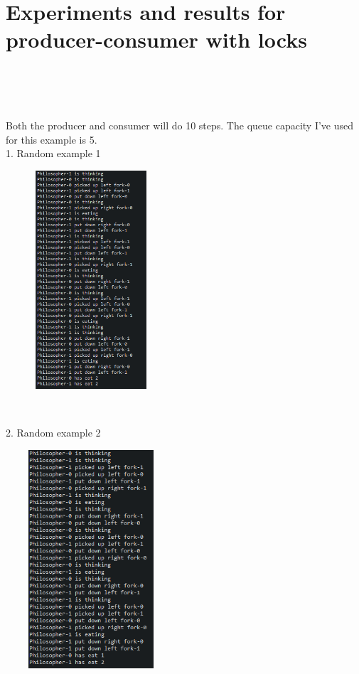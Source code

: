 \documentclass[14pt]{article}
\begin{document}
\section*{Experiments and results for producer-consumer with locks}
\\\\\\
\begin{center}
Both the producer and consumer will do 10 steps. The queue capacity I've used for this example is 5.\\
1. Random example 1\\
\vspace{10mm}

\includegraphics[height=3.2in, width = 2.5in]{philolock1.png}\\
\end{center}\\
\begin{center}
2. Random example 2\\
\vspace{10mm}

\includegraphics[height=3.2in, width = 2.5in]{philolock2.png}\\
\end{center}\\
\end{document}
